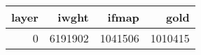 \begin{tabular}{rrrr}
\toprule
 layer &   iwght &   ifmap &    gold \\
\midrule
     0 & 6191902 & 1041506 & 1010415 \\
\bottomrule
\end{tabular}
